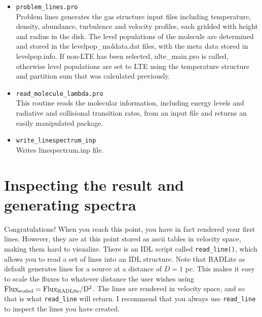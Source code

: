 \documentclass[11pt]{article}
\begin{document}
\begin{itemize}
\item {\tt problem\_lines.pro}\\
Problem lines generates the gas structure input files including temperature, density, abundance, turbulence and velocity profiles, each gridded with height and radius in the disk.  The level populations of the molecule are determined and stored in the levelpop\_moldata.dat files, with the meta data stored in levelpop.info.  If non-LTE has been selected, nlte\_main.pro is called, otherwise level populations are set to LTE using the temperature structure and partition sum that was calculated previously.

\item{\tt read\_molecule\_lambda.pro}\\
This routine reads the molecular information, including energy levels and radiative and collisional transition rates, from an input file and returns an easily manipulated package.

\item {\tt write\_linespectrum\_inp}\\
Writes linespectrum.inp file.
 
\end{itemize}

\section{Inspecting the result and generating spectra}

Congratulations! When you reach this point, you have in fact rendered your first lines. However, they are at this point stored as ascii tables in
velocity space, making them hard to visualize. There is an IDL script called {\tt read\_line()}, which allows you to read a 
set of lines into an IDL structure. Note that RADLite as default generates lines for a source at a distance of $D=1$ pc.
This makes it easy to scale the fluxes to whatever distance the user wishes using $\rm Flux_{scaled} = Flux_{RADLite}/D^2$.
The lines are rendered in velocity space, and so that is what {\tt read\_line} will return. 
I recommend that you always use {\tt read\_line} to inspect the lines you have created. 
\end{document}
